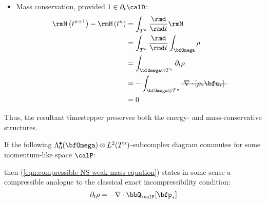 \begin{itemize}
        \item  Mass conservation, provided $1 \in \partial_{t}\calD$:
        \begin{align}
                \rmM\left(t^{n + 1}\right) - \rmM\left(t^{n}\right)
                &=  \int_{T^{n}}\frac{\rmd}{\rmd t}\rmM  \\
                &=  \int_{T^{n}}\frac{\rmd}{\rmd t}\int_{\bfOmega}\rho  \\
                &=  \int_{\bfOmega\otimes T^{n}}\partial_{t}\rho  \\
                &=  - \int_{\bfOmega\otimes T^{n}}\mst{\nabla\cdot[\rho_{*}\bfu_{*}]}  \\
                &=  0
        \end{align}
    \end{itemize}
    Thus, the resultant timestepper preserves both the energy- and mass-conservative structures.

    \shortline

    If the following $\Lambda_{0}^{\bullet}(\bfOmega)\otimes L^{2}(T^{n})$-subcomplex diagram commutes for some momentum-like space $\calP$:
    \begin{center}\end{center}
    then (\ref{eqn:compressible NS weak mass equation}) states in some sense a compressible analogue to the classical exact incompressibility condition:
    \begin{equation}\label{eqn:weak incompressibility}
        \partial_{t}\rho  =  - \nabla\cdot\bbQ_{\calP}[\bfp_{*}]
    \end{equation}

    \line

